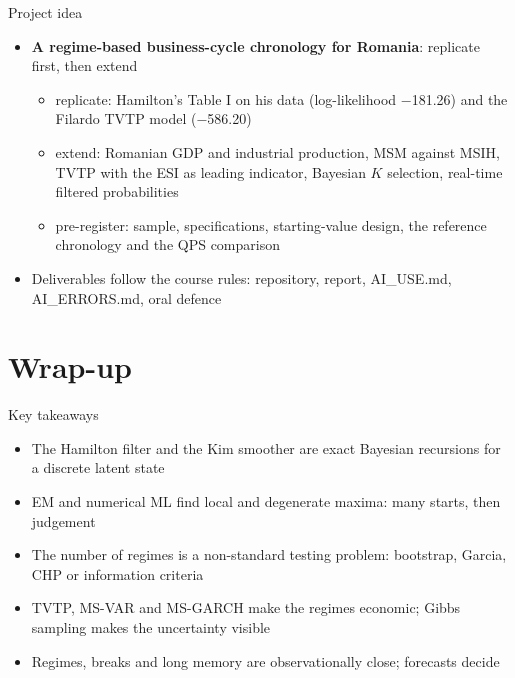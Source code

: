 \begin{frame}{Project idea}
\itemsize{\small}
\begin{itemize}
    \item \textbf{A regime-based business-cycle chronology for Romania}: replicate first, then extend
    \begin{itemize}
        \item replicate: Hamilton's Table I on his data (log-likelihood \ensuremath{-}181.26) and the Filardo TVTP model (\ensuremath{-}586.20)
        \item extend: Romanian GDP and industrial production, MSM against MSIH, TVTP with the ESI as leading indicator, Bayesian $K$ selection, real-time filtered probabilities
        \item pre-register: sample, specifications, starting-value design, the reference chronology and the QPS comparison
    \end{itemize}
    \item Deliverables follow the course rules: repository, report, AI\_USE.md, AI\_ERRORS.md, oral defence
\end{itemize}
\end{frame}


\section{Wrap-up}

\begin{frame}{Key takeaways}
\itemsize{\small}
\begin{itemize}
    \item The Hamilton filter and the Kim smoother are exact Bayesian recursions for a discrete latent state
    \item EM and numerical ML find local and degenerate maxima: many starts, then judgement
    \item The number of regimes is a non-standard testing problem: bootstrap, Garcia, CHP or information criteria
    \item TVTP, MS-VAR and MS-GARCH make the regimes economic; Gibbs sampling makes the uncertainty visible
    \item Regimes, breaks and long memory are observationally close; forecasts decide
\end{itemize}
\end{frame}

